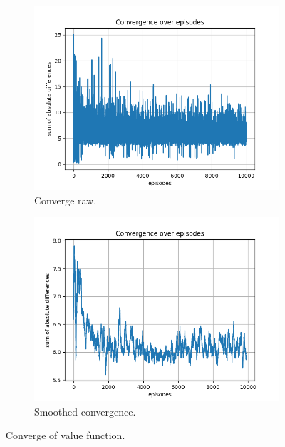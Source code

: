 \documentclass{assignment}
\begin{document}
\begin{figure}[H]
    \begin{subfigure}{0.5\textwidth}
        \includegraphics[width=\textwidth]{figures/convergence_q/default/convergence_Q_alpha_0.1_gamma_0.95_epislon_0.2.png}
    \caption{Converge raw.}
    \end{subfigure}\hfill
    \begin{subfigure}{0.5\textwidth}
        \includegraphics[width=\textwidth]{figures/convergence_q/default/convergence_Q_smoothed_alpha_0.1_gamma_0.95_epislon_0.2.png}
    \caption{Smoothed convergence.}
    \end{subfigure}
    \caption{Converge of value function.}
    \label{fig:default_q_learning_convergence}
\end{figure}
\end{document}
